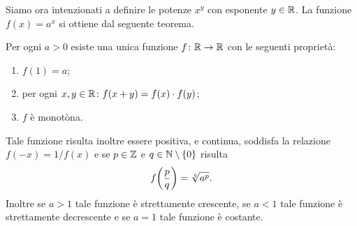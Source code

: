 Siamo ora intenzionati a definire le potenze $x^y$ con esponente $y\in \mathbb R$.
La funzione $f(x) = a^x$ si ottiene dal seguente teorema.

\begin{theorem}
  \label{th:esponenziale}
Per ogni $a>0$ esiste una unica funzione $f\colon \mathbb R \to \mathbb R$
con le seguenti proprietà:
\begin{enumerate}
\item $f(1) = a$;
\item per ogni $x,y\in \mathbb R\colon f(x+y) = f(x)\cdot f(y)$;
\item $f$ è monotòna.
\end{enumerate}
Tale funzione risulta inoltre essere positiva, e
continua, soddisfa la relazione $f(-x)= 1/f(x)$ e
se $p\in \mathbb Z$ e $q\in \mathbb N\setminus\{0\}$ risulta
\[
  f{\left( \frac p q \right)} = \sqrt[q]{a^p}.
\]
Inoltre se $a>1$ tale funzione è strettamente crescente,
se $a<1$ tale funzione è strettamente decrescente e se $a=1$
tale funzione è costante.
\end{theorem}
%
